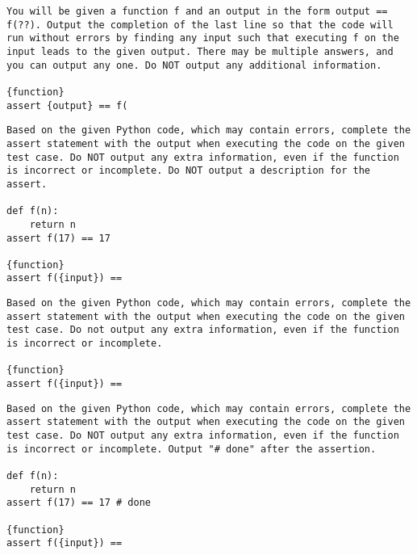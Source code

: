 \begin{lstlisting}[caption={Input Prediction (GPT)},label={lst:benchmark-direct-input-prompt-gpt}, captionpos=t, breaklines=true]
You will be given a function f and an output in the form output == f(??). Output the completion of the last line so that the code will run without errors by finding any input such that executing f on the input leads to the given output. There may be multiple answers, and you can output any one. Do NOT output any additional information.

{function}
assert {output} == f(
\end{lstlisting}

\begin{lstlisting}[caption={Output Prediction (non-GPT, non-Phind)},label={lst:benchmark-direct-output-prompt-llama}, captionpos=t, breaklines=true]
Based on the given Python code, which may contain errors, complete the assert statement with the output when executing the code on the given test case. Do NOT output any extra information, even if the function is incorrect or incomplete. Do NOT output a description for the assert.

def f(n):
    return n
assert f(17) == 17

{function}
assert f({input}) ==
\end{lstlisting}

\begin{lstlisting}[caption={Output Prediction (GPT)},label={lst:benchmark-direct-output-prompt-gpt}, captionpos=t, breaklines=true]
Based on the given Python code, which may contain errors, complete the assert statement with the output when executing the code on the given test case. Do not output any extra information, even if the function is incorrect or incomplete.

{function}
assert f({input}) == 
\end{lstlisting}

\begin{lstlisting}[caption={Output Prediction (Phind)},label={lst:benchmark-direct-output-prompt-phind}, captionpos=t, breaklines=true]
Based on the given Python code, which may contain errors, complete the assert statement with the output when executing the code on the given test case. Do NOT output any extra information, even if the function is incorrect or incomplete. Output "# done" after the assertion.

def f(n):
    return n
assert f(17) == 17 # done

{function}
assert f({input}) ==
\end{lstlisting}


